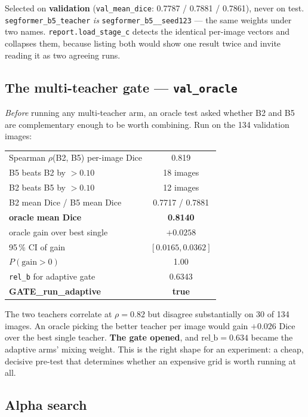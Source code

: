 \documentclass[11pt]{article}
\begin{document}
Selected on \textbf{validation} (\texttt{val\_mean\_dice}: 0.7787 / 0.7881 /
0.7861), never on test. \texttt{segformer\_b5\_teacher} \emph{is}
\texttt{segformer\_b5\_\_seed123} --- the same weights under two names.
\texttt{report.load\_stage\_c} detects the identical per-image vectors and
collapses them, because listing both would show one result twice and invite
reading it as two agreeing runs.

\subsection{The multi-teacher gate --- \texttt{val\_oracle}}

\emph{Before} running any multi-teacher arm, an oracle test asked whether B2 and
B5 are complementary enough to be worth combining. Run on the 134 validation
images:

\begin{center}
\begin{tabular}{lC}
\toprule
Spearman $\rho$(B2, B5) per-image Dice & 0.819 \\
B5 beats B2 by $>0.10$ & 18 images \\
B2 beats B5 by $>0.10$ & 12 images \\
B2 mean Dice / B5 mean Dice & 0.7717 / 0.7881 \\
\textbf{oracle mean Dice} & \textbf{0.8140} \\
oracle gain over best single & $+0.0258$ \\
95\,\% CI of gain & $[0.0165, 0.0362]$ \\
$P(\text{gain} > 0)$ & 1.00 \\
\texttt{rel\_b} for adaptive gate & 0.6343 \\
\textbf{GATE\_run\_adaptive} & \textbf{true} \\
\bottomrule
\end{tabular}
\end{center}

The two teachers correlate at $\rho=0.82$ but disagree substantially on 30 of 134
images. An oracle picking the better teacher per image would gain $+0.026$ Dice
over the best single teacher. \textbf{The gate opened}, and $\mathrm{rel\_b}=0.634$
became the adaptive arms' mixing weight. This is the right shape for an
experiment: a cheap, decisive pre-test that determines whether an expensive grid
is worth running at all.

\subsection{Alpha search}
\end{document}
